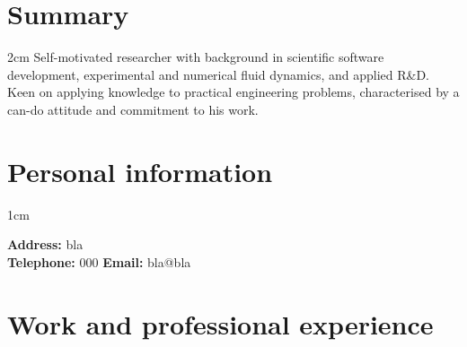 \documentclass[a4paper,10pt]{article}
\begin{document}
\pagestyle{empty} %

\par{\par\par}

\section{Summary}

\hspace{1cm}
\begin{minipage}{\textwidth}
\begin{adjustwidth}{}{2cm} %
	Self-motivated researcher with background in scientific
		software development, experimental
		and numerical fluid dynamics, and applied R\&D.
	Keen on applying knowledge to practical engineering problems,
		characterised by a can-do attitude and commitment to his work.
\end{adjustwidth}
\end{minipage}

\section{Personal information}

\begin{minipage}{\textwidth}
\begin{adjustwidth}{}{1cm} %

\textbf{Address:} bla \\
\textbf{Telephone:} 000  \hspace{2cm} \textbf{Email:} bla@bla

\end{adjustwidth}
\end{minipage}


\section{Work and professional experience}
\end{document}
